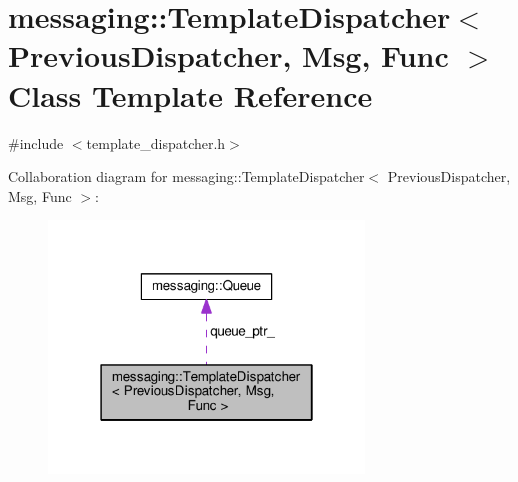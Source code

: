 \hypertarget{classmessaging_1_1TemplateDispatcher}{\section{messaging\-:\-:Template\-Dispatcher$<$ Previous\-Dispatcher, Msg, Func $>$ Class Template Reference}
\label{classmessaging_1_1TemplateDispatcher}
}


{\ttfamily \#include $<$template\-\_\-dispatcher.\-h$>$}



Collaboration diagram for messaging\-:\-:Template\-Dispatcher$<$ Previous\-Dispatcher, Msg, Func $>$\-:
\nopagebreak
\begin{figure}[H]
\begin{center}
\leavevmode
\includegraphics[width=238pt]{classmessaging_1_1TemplateDispatcher__coll__graph}
\end{center}
\end{figure}
